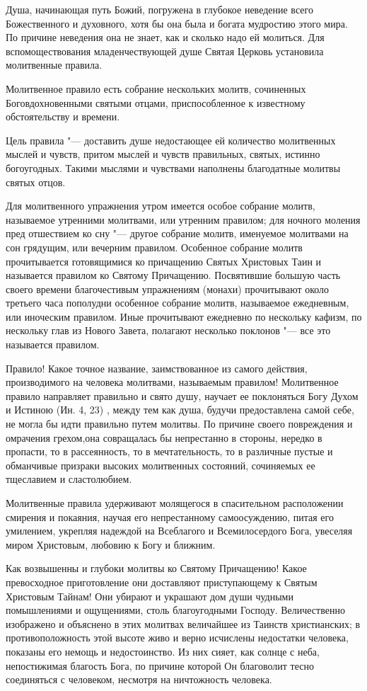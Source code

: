 {{{{Душа, начинающая путь Божий, погружена в глубокое неведение всего Божественного и духовного, хотя бы она была и богата мудростию этого мира. По причине неведения она не знает, как и сколько надо ей молиться. Для вспомоществования младенчествующей душе Святая Церковь установила молитвенные правила.

Молитвенное правило есть собрание нескольких молитв, сочиненных Боговдохновенными святыми отцами, приспособленное к известному обстоятельству и времени.

Цель правила "--- доставить душе недостающее ей количество молитвенных мыслей и чувств, притом мыслей и чувств правильных, святых, истинно богоугодных. Такими мыслями и чувствами наполнены благодатные молитвы святых отцов.

Для молитвенного упражнения утром имеется особое собрание молитв, называемое утренними молитвами, или утренним правилом; для ночного моления пред отшествием ко сну "--- другое собрание молитв, именуемое молитвами на сон грядущим, или вечерним правилом. Особенное собрание молитв прочитывается готовящимися ко причащению Святых Христовых Таин и называется правилом ко Святому Причащению. Посвятившие большую часть своего времени благочестивым упражнениям (монахи) прочитывают около третьего часа пополудни особенное собрание молитв, называемое ежедневным, или иноческим правилом. Иные прочитывают ежедневно по нескольку кафизм, по нескольку глав из Нового Завета, полагают несколько поклонов "--- все это называется правилом.

Правило! Какое точное название, заимствованное из самого действия, производимого на человека молитвами, называемым правилом! Молитвенное правило направляет правильно и свято душу, научает ее поклоняться Богу Духом и Истиною (Ин. 4, 23) , между тем как душа, будучи предоставлена самой себе, не могла бы идти правильно путем молитвы. По причине своего повреждения и омрачения грехом,она совращалась бы непрестанно в стороны, нередко в пропасти, то в рассеянность, то в мечтательность, то в различные пустые и обманчивые призраки высоких молитвенных состояний, сочиняемых ее тщеславием и сластолюбием.

Молитвенные правила удерживают молящегося в спасительном расположении смирения и покаяния, научая его непрестанному самоосуждению, питая его умилением, укрепляя надеждой на Всеблагого и Всемилосердого Бога, увеселяя миром Христовым, любовию к Богу и ближним.

Как возвышенны и глубоки молитвы ко Святому Причащению! Какое превосходное приготовление они доставляют приступающему к Святым Христовым Тайнам! Они убирают и украшают дом души чудными помышлениями и ощущениями, столь благоугодными Господу. Величественно изображено и объяснено в этих молитвах величайшее из Таинств христианских; в противоположность этой высоте живо и верно исчислены недостатки человека, показаны его немощь и недостоинство. Из них сияет, как солнце с неба, непостижимая благость Бога, по причине которой Он благоволит тесно соединяться с человеком, несмотря на ничтожность человека.

}}}}
